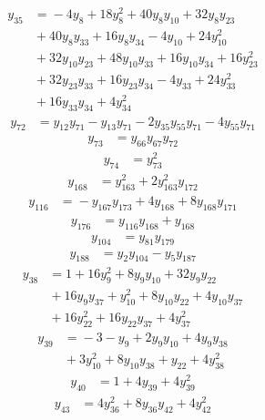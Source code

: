 \begin{align*}
y_{35} &={} -4y_{8} +18y_{8}^{2} +40y_{8}y_{10} +32y_{8}y_{23} \\
 &{} +40y_{8}y_{33} +16y_{8}y_{34} -4y_{10} +24y_{10}^{2} \\
 &{} +32y_{10}y_{23} +48y_{10}y_{33} +16y_{10}y_{34} +16y_{23}^{2} \\
 &{} +32y_{23}y_{33} +16y_{23}y_{34} -4y_{33} +24y_{33}^{2} \\
 &{} +16y_{33}y_{34} +4y_{34}^{2}
\end{align*}
\begin{align*}
y_{72} &={} y_{12}y_{71} -y_{13}y_{71} -2y_{35}y_{55}y_{71} -4y_{55}y_{71}
\end{align*}
\begin{align*}
y_{73} &={} y_{66}y_{67}y_{72}
\end{align*}
\begin{align*}
y_{74} &={} y_{73}^{2}
\end{align*}
\begin{align*}
y_{168} &={} y_{163}^{2} +2y_{163}^{2}y_{172}
\end{align*}
\begin{align*}
y_{116} &={} -y_{167}y_{173} +4y_{168} +8y_{168}y_{171}
\end{align*}
\begin{align*}
y_{176} &={} y_{116}y_{168} +y_{168}
\end{align*}
\begin{align*}
y_{104} &={} y_{81}y_{179}
\end{align*}
\begin{align*}
y_{188} &={} y_{2}y_{104} -y_{5}y_{187}
\end{align*}
\begin{align*}
y_{38} &={} 1 +16y_{9}^{2} +8y_{9}y_{10} +32y_{9}y_{22} \\
 &{} +16y_{9}y_{37} +y_{10}^{2} +8y_{10}y_{22} +4y_{10}y_{37} \\
 &{} +16y_{22}^{2} +16y_{22}y_{37} +4y_{37}^{2}
\end{align*}
\begin{align*}
y_{39} &={} -3 -y_{9} +2y_{9}y_{10} +4y_{9}y_{38} \\
 &{} +3y_{10}^{2} +8y_{10}y_{38} +y_{22} +4y_{38}^{2}
\end{align*}
\begin{align*}
y_{40} &={} 1 +4y_{39} +4y_{39}^{2}
\end{align*}
\begin{align*}
y_{43} &={} 4y_{36}^{2} +8y_{36}y_{42} +4y_{42}^{2}
\end{align*}
